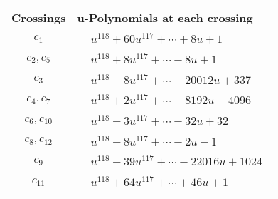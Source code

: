 \documentclass[1p]{elsarticle_modified}
\theoremstyle{definition}
\begin{document}
\begin{tabular}{m{50pt}|m{274pt}}
Crossings & \hspace{64pt}u-Polynomials at each crossing \\
\hline $$\begin{aligned}c_{1}\end{aligned}$$&$\begin{aligned}
&u^{118}+60 u^{117}+\cdots+8 u+1
\end{aligned}$\\
\hline $$\begin{aligned}c_{2},c_{5}\end{aligned}$$&$\begin{aligned}
&u^{118}+8 u^{117}+\cdots+8 u+1
\end{aligned}$\\
\hline $$\begin{aligned}c_{3}\end{aligned}$$&$\begin{aligned}
&u^{118}-8 u^{117}+\cdots-20012 u+337
\end{aligned}$\\
\hline $$\begin{aligned}c_{4},c_{7}\end{aligned}$$&$\begin{aligned}
&u^{118}+2 u^{117}+\cdots-8192 u-4096
\end{aligned}$\\
\hline $$\begin{aligned}c_{6},c_{10}\end{aligned}$$&$\begin{aligned}
&u^{118}-3 u^{117}+\cdots-32 u+32
\end{aligned}$\\
\hline $$\begin{aligned}c_{8},c_{12}\end{aligned}$$&$\begin{aligned}
&u^{118}-8 u^{117}+\cdots-2 u-1
\end{aligned}$\\
\hline $$\begin{aligned}c_{9}\end{aligned}$$&$\begin{aligned}
&u^{118}-39 u^{117}+\cdots-22016 u+1024
\end{aligned}$\\
\hline $$\begin{aligned}c_{11}\end{aligned}$$&$\begin{aligned}
&u^{118}+64 u^{117}+\cdots+46 u+1
\end{aligned}$\\
\hline
\end{tabular}\\~\\
\end{document}
